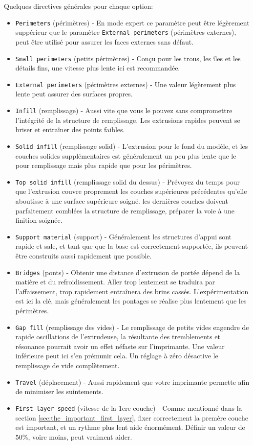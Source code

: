Quelques directives g\'en\'erales pour chaque option:
\begin{itemize}
	\item \texttt{Perimeters} (p\'erim\`etres) - En mode expert ce param\`etre peut \^etre l\'eg\`erement supp\'erieur que le param\`etre \texttt{External perimeters} (p\'erim\`etres externes), peut \^etre utilis\'e pour assurer les faces externes sans d\'efaut.
	\item \texttt{Small perimeters} (petits p\'erim\`etres) - Conçu pour les trous, les \^iles et les d\'etails fins, une vitesse plus lente ici est recommand\'ee.
	\item \texttt{External perimeters} (p\'erim\`etres externes) - Une valeur l\'eg\`erement plus lente peut assurer des surfaces propres.
	\item \texttt{Infill} (remplissage) - Aussi vite que vous le pouvez sans compromettre l'int\'egrit\'e de la structure de remplissage. Les extrusions rapides peuvent se briser et entra\^iner des points faibles.
	\item \texttt{Solid infill} (remplissage solid) - L'extrusion pour le fond du mod\`ele, et les couches solides suppl\'ementaires est g\'en\'eralement un peu plus lente que le pour remplissage mais plus rapide que pour les p\'erim\`etres.
	\item \texttt{Top solid infill} (remplissage solid du dessus) - Pr\'evoyez du temps pour que l'extrusion couvre proprement les couches sup\'erieures pr\'ec\'edentes qu'elle aboutisse \`a une surface sup\'erieure soign\'e. les derni\`eres couches doivent parfaitement combl\'ees la structure de remplissage, pr\'eparer la voie \`a une finition soign\'ee.
	\item \texttt{Support material} (support) - G\'en\'eralement les structures d'appui sont rapide et sale, et tant que que la base est correctement support\'ee, ils peuvent \^etre construits aussi rapidement que possible.
	\item \texttt{Bridges} (ponts) - Obtenir une distance d'extrusion de port\'ee d\'epend de la mati\`ere et du refroidissement. Aller trop lentement se traduira par l'affaissement, trop rapidement entra\^inera des brins cass\'es. L'exp\'erimentation est ici la cl\'e, mais g\'en\'eralement les pontages se r\'ealise plus lentement que les p\'erim\`etres.
	\item \texttt{Gap fill} (remplissage des vides) - Le remplissage de petits vides engendre de rapide oscillations de l'extrudeuse, la r\'esultante des tremblements et r\'esonance pourrait avoir un effet n\'efaste sur l'imprimante. Une valeur inf\'erieure peut ici s'en pr\'emunir cela. Un r\'eglage \`a z\'ero d\'esactive le remplissage de vide compl\`etement.
	\item \texttt{Travel} (d\'eplacement) - Aussi rapidement que votre imprimante permette afin de minimiser les suintements.
	\item \texttt{First layer speed} (vitesse de la 1ere couche) - Comme mentionn\'e dans la section \ref{sec:the_important_first_layer}, fixer correctement la prem\`ere couche est important, et un rythme plus lent aide \'enorm\'ement. D\'efinir un valeur de 50\%, voire moins, peut vraiment aider.
\end{itemize}

